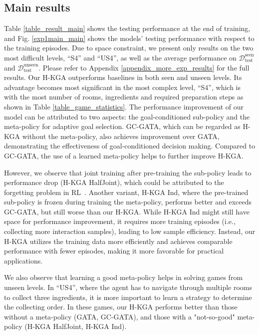 \documentclass[11pt]{article}
\begin{document}
\subsection{Main results \label{section_exp_main_result}}

Table \ref{table_result_main} shows the testing performance at the end of training, and Fig. \ref{exp1main_main} shows the models' testing performance with respect to the training episodes. 
Due to space constraint, we present only results on the two most difficult levels, ``S4'' and ``US4'', as well as the average performance on $\mathcal{D}_{\text{test}}^{\text{seen}}$ and $\mathcal{D}_{\text{test}}^{\text{unseen}}$.
Please refer to Appendix \ref{appendix_more_exp_results} for the full results. 
Our H-KGA outperforms baselines in both seen and unseen levels. 
Its advantage becomes most significant in the most complex level, ``S4'', which is with the most number of rooms, ingredients and required preparation steps as shown in Table \ref{table_game_statistics}. 
The performance improvement of our model can be attributed to two aspects: the goal-conditioned sub-policy and the meta-policy for adaptive goal selection. 
GC-GATA, which can be regarded as H-KGA without the meta-policy, also achieves improvement over GATA, demonstrating the effectiveness of goal-conditioned decision making.
Compared to GC-GATA, the use of a learned meta-policy helps to further improve H-KGA.

However, we observe that joint training after pre-training the sub-policy leads to performance drop (H-KGA HalfJoint), which could be attributed to the forgetting problem in RL~\cite{vinyals2019alphastar}.
Another variant, H-KGA Ind, where the pre-trained sub-policy is frozen during training the meta-policy, performs better and exceeds GC-GATA, but still worse than our H-KGA.
While H-KGA Ind might still have space for performance improvement, it requires more training episodes (i.e., collecting more interaction samples), leading to low sample efficiency. 
Instead, our H-KGA utilizes the training data more efficiently and achieves comparable performance with fewer episodes, making it more favorable for practical applications. 

We also observe that learning a good meta-policy helps in solving games from unseen levels. 
In ``US4'', where the agent has to navigate through multiple rooms to collect three ingredients, it is more important to learn a strategy to determine the collecting order. 
In these games, our H-KGA performs better than those without a meta-policy (GATA, GC-GATA), and those with a "not-so-good" meta-policy (H-KGA HalfJoint, H-KGA Ind). 
\end{document}
